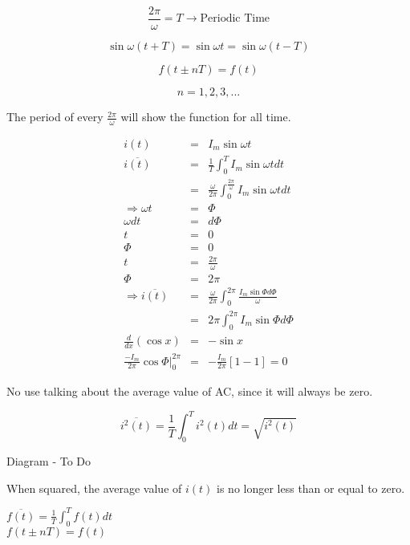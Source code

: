 \documentclass[a4paper,12pt]{article}
\begin{document}
\[ \frac{2 \pi}{\omega} = T \rightarrow \mbox{Periodic Time} \]

\[ \sin \omega (t + T) = \sin \omega t = \sin \omega (t - T) \]

\[ f(t \pm nT) = f(t) \]

\[ n = 1, 2, 3, ... \]

The period of every $\frac{2 \pi}{\omega}$ will show the
function for all time.

\begin{eqnarray*}
i(t) 				 & = & I_{m} \sin \omega t \\
\overline{i(t)} & = & \frac{1}{T} \int^{T}_{0} I_{m} \sin \omega t dt \\
					 & = & \frac{\omega}{2 \pi} \int^{\frac{2 \pi}{\omega}}_{0} I_{m} \sin \omega t dt \\
\Rightarrow \omega t & = & \Phi \\
		\omega dt & = & d \Phi \\
				  t & = & 0 \\
			  \Phi & = & 0 \\
				  t & = & \frac{2 \pi}{\omega} \\
			  \Phi & = & 2 \pi \\
\Rightarrow \overline{i(t)} & = & \frac{\omega}{2 \pi} \int^{2 \pi}_{0} \frac{I_{m} \sin \Phi d \Phi}{\omega} \\
					 & = & 2 \pi \int^{2 \pi}_{0} I_{m} \sin \Phi d \Phi \\
\frac{d}{dx} (\cos x)& = & - \sin x \\
\frac{-I_{m}}{2 \pi} \cos \Phi |^{2 \pi}_{0} & = & -
\frac{I_{m}}{2 \pi} \left[ 1 - 1\right] = 0
\end{eqnarray*}

No use talking about the average value of AC, since it will
always be zero.

\[ \overline{i^{2}(t)} = \frac{1}{T} \int^{T}_{0} i^{2}(t) dt =
\sqrt{i^{2}(t)} \]

\begin{table}[hbtp]

Diagram - To Do

\end{table}

When squared, the average value of $i(t)$ is no longer less
than or equal to zero.


$ \overline{f(t)} = \frac{1}{T} \int^{T}_{0} f(t) dt $ \\
$ f(t \pm nT) = f(t) $ \\
\end{document}
